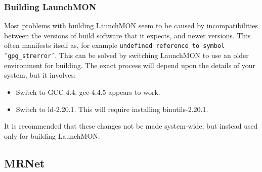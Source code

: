 \documentclass{refart}
\begin{document}
\subsubsection{Building LaunchMON}

Most problems with building LaunchMON seem to be caused by incompatibilities between the versions of build software that it expects, and newer versions. This often manifests itself as, for example \texttt{undefined reference to symbol 'gpg\_strerror'}. This can be solved by switching LaunchMON to use an older environment for building. The exact process will depend upon the details of your system, but it involves:
\begin{itemize}
\item Switch to GCC 4.4. gcc-4.4.5 appears to work.
\item Switch to ld-2.20.1. This will require installing binutils-2.20.1.
\end{itemize}
It is recommended that these changes not be made system-wide, but instead used only for building LaunchMON.

\subsection{MRNet}

\cleardoublepage
{}
{}
\printindex
\end{document}
